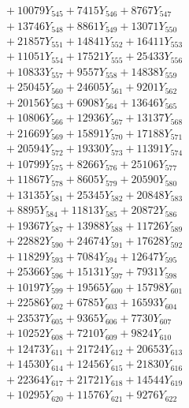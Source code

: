 \documentclass[a4paper,10pt]{article}
\begin{document}
{\begin{align}
&\;  + 10079 Y_{545} + 7415 Y_{546} + 8767 Y_{547} \\[0.3ex]
&\;  + 13746 Y_{548} + 8861 Y_{549} + 13071 Y_{550} \\[0.3ex]
&\;  + 21857 Y_{551} + 14841 Y_{552} + 16411 Y_{553} \\[0.3ex]
&\;  + 11051 Y_{554} + 17521 Y_{555} + 25433 Y_{556} \\[0.3ex]
&\;  + 10833 Y_{557} + 9557 Y_{558} + 14838 Y_{559} \\[0.3ex]
&\;  + 25045 Y_{560} + 24605 Y_{561} + 9201 Y_{562} \\[0.3ex]
&\;  + 20156 Y_{563} + 6908 Y_{564} + 13646 Y_{565} \\[0.3ex]
&\;  + 10806 Y_{566} + 12936 Y_{567} + 13137 Y_{568} \\[0.5ex]\allowbreak
&\;  + 21669 Y_{569} + 15891 Y_{570} + 17188 Y_{571} \\[0.3ex]
&\;  + 20594 Y_{572} + 19330 Y_{573} + 11391 Y_{574} \\[0.3ex]
&\;  + 10799 Y_{575} + 8266 Y_{576} + 25106 Y_{577} \\[0.3ex]
&\;  + 11867 Y_{578} + 8605 Y_{579} + 20590 Y_{580} \\[0.3ex]
&\;  + 13135 Y_{581} + 25345 Y_{582} + 20848 Y_{583} \\[0.3ex]
&\;  + 8895 Y_{584} + 11813 Y_{585} + 20872 Y_{586} \\[0.3ex]
&\;  + 19367 Y_{587} + 13988 Y_{588} + 11726 Y_{589} \\[0.3ex]
&\;  + 22882 Y_{590} + 24674 Y_{591} + 17628 Y_{592} \\[0.3ex]
&\;  + 11829 Y_{593} + 7084 Y_{594} + 12647 Y_{595} \\[0.3ex]
&\;  + 25366 Y_{596} + 15131 Y_{597} + 7931 Y_{598} \\[0.5ex]\allowbreak
&\;  + 10197 Y_{599} + 19565 Y_{600} + 15798 Y_{601} \\[0.3ex]
&\;  + 22586 Y_{602} + 6785 Y_{603} + 16593 Y_{604} \\[0.3ex]
&\;  + 23537 Y_{605} + 9365 Y_{606} + 7730 Y_{607} \\[0.3ex]
&\;  + 10252 Y_{608} + 7210 Y_{609} + 9824 Y_{610} \\[0.3ex]
&\;  + 12473 Y_{611} + 21724 Y_{612} + 20653 Y_{613} \\[0.3ex]
&\;  + 14530 Y_{614} + 12456 Y_{615} + 21830 Y_{616} \\[0.3ex]
&\;  + 22364 Y_{617} + 21721 Y_{618} + 14544 Y_{619} \\[0.3ex]
&\;  + 10295 Y_{620} + 11576 Y_{621} + 9276 Y_{622} \\[0.3ex]

\end{align}}
\end{document}
